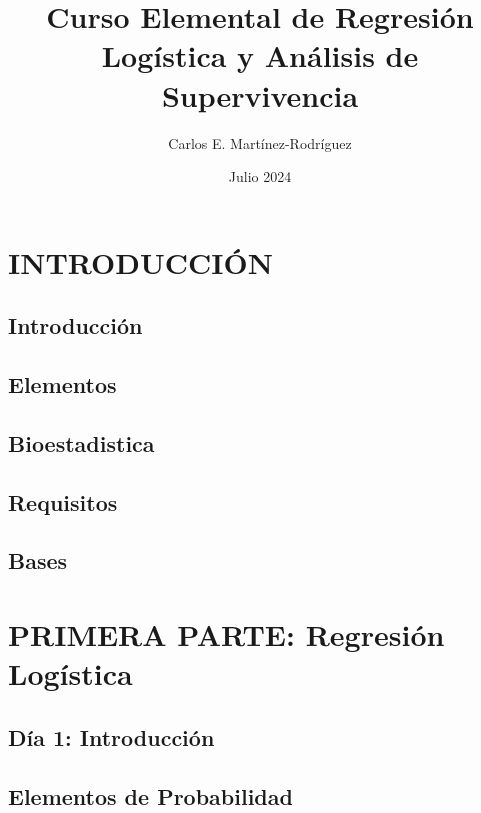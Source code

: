 \documentclass{report}
\title{Curso Elemental de Regresión Logística y Análisis de Supervivencia}
\author{Carlos E. Martínez-Rodríguez}
\date{Julio 2024}
\begin{document}
\maketitle

\tableofcontents
\part{INTRODUCCIÓN}
\chapter{Introducción}

%
\chapter{Elementos}

\chapter{Bioestadistica}

\chapter{Requisitos}

\chapter{Bases}


\part{PRIMERA PARTE: Regresión Logística}

\chapter{Día 1: Introducción}


\chapter{Elementos de Probabilidad}

\end{document}

